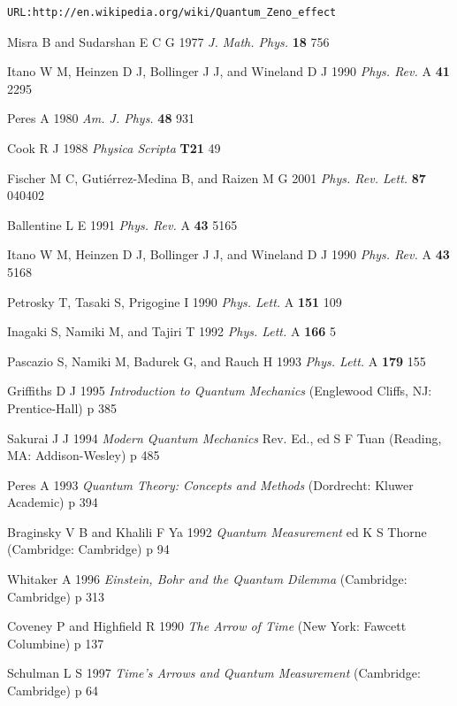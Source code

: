 \documentclass[12pt]{article}
\begin{document}
\begin{thebibliography}{99}

\begin{verbatim}
URL:http://en.wikipedia.org/wiki/Quantum_Zeno_effect\end{verbatim}

Misra B and Sudarshan E C G 1977 {\it J. Math.
Phys.} {\bf 18} 756

Itano W M, Heinzen D J, Bollinger J J, and Wineland
D J 1990 {\it Phys. Rev.} A {\bf 41} 2295

Peres A 1980 {\it Am. J. Phys.} {\bf 48} 931

Cook R J 1988 {\it Physica Scripta} {\bf T21} 49

Fischer M C, Guti\'errez-Medina B, and Raizen M G
2001 {\it Phys. Rev. Lett.} {\bf 87} 040402

Ballentine L E 1991 {\it Phys. Rev.} A {\bf
43} 5165

Itano W M, Heinzen D J, Bollinger J J, and Wineland
D J 1990 {\it Phys. Rev.} A {\bf 43} 5168

Petrosky T, Tasaki S, Prigogine I 1990 {\it
Phys. Lett.} A {\bf 151} 109

Inagaki S, Namiki M, and Tajiri T 1992 {\it Phys.
Lett.} A {\bf 166} 5

Pascazio S, Namiki M, Badurek G, and Rauch H
1993 {\it Phys. Lett.} A {\bf 179} 155

Griffiths D J 1995 {\it Introduction to Quantum
Mechanics} (Englewood Cliffs, NJ: Prentice-Hall) p 385

Sakurai J J 1994 {\it Modern Quantum Mechanics}
Rev. Ed., ed S F Tuan (Reading, MA: Addison-Wesley) p 485

Peres A 1993 {\it Quantum Theory: Concepts and Methods}
(Dordrecht: Kluwer Academic) p 394

Braginsky V B and Khalili F Ya 1992 {\it
Quantum Measurement} ed K S Thorne (Cambridge: Cambridge) p 94

Whitaker A 1996 {\it Einstein, Bohr and the
Quantum Dilemma} (Cambridge: Cambridge) p 313

Coveney P and Highfield R 1990 {\it The Arrow of
Time} (New York: Fawcett Columbine) p 137

Schulman L S 1997 {\it Time's Arrows and Quantum
Measurement} (Cambridge: Cambridge) p 64


\end{thebibliography}
\end{document}
